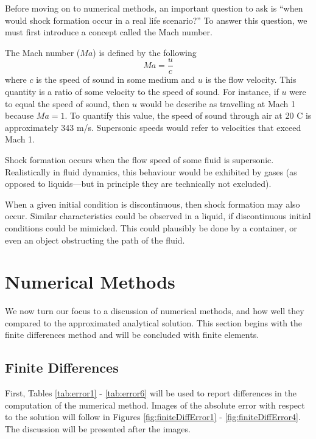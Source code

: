 \documentclass[undefended]{sfuthesis}
\begin{document}
Before moving on to numerical methods, an important question to ask is ``when would shock formation occur in a real life scenario?'' To answer this question, we must first introduce a concept called the Mach number.

The Mach number ($Ma$) is defined by the following \[Ma = \frac{u}{c}\] where $c$ is the speed of sound in some medium and $u$ is the flow velocity. This quantity is a ratio of some velocity to the speed of sound. For instance, if $u$ were to equal the speed of sound, then $u$ would be describe as travelling at Mach 1 because $Ma = 1.$ To quantify this value, the speed of sound through air at 20 \textdegree C is approximately 343 m/s. Supersonic speeds would refer to velocities that exceed Mach 1.

Shock formation occurs when the flow speed of some fluid is supersonic. Realistically in fluid dynamics, this behaviour would be exhibited by gases (as opposed to liquids---but in principle they are technically not excluded).

When a given initial condition is discontinuous, then shock formation may also occur. Similar characteristics could be observed in a liquid, if discontinuous initial conditions could be mimicked. This could plausibly be done by a container, or even an object obstructing the path of the fluid.

\section{Numerical Methods}

We now turn our focus to a discussion of numerical methods, and how well they compared to the approximated analytical solution. This section begins with the finite differences method and will be concluded with finite elements.

\subsection{Finite Differences}
\label{sec:FiniteDifferences}

First, Tables \ref{tab:error1} - \ref{tab:error6} will be used to report differences in the computation of the numerical method. Images of the absolute error with respect to the solution will follow in Figures \ref{fig:finiteDiffError1} - \ref{fig:finiteDiffError4}. The discussion will be presented after the images.
\end{document}
